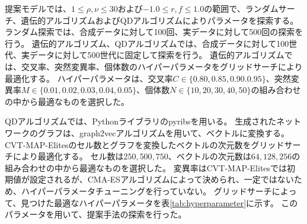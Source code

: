 \documentclass[uplatex,11pt,openany]{ujreport}
\begin{document}
        提案モデルでは、$1\leq \rho,\nu \leq30$および$-1.0\leq r,f\leq 1.0$の範囲で、ランダムサーチ、遺伝的アルゴリズムおよびQDアルゴリズムによりパラメータを探索する。
        ランダム探索では、合成データに対して100回、実データに対して500回の探索を行う。
        遺伝的アルゴリズム、QDアルゴリズムでは、合成データに対して100世代、実データに対して500世代に固定して探索を行う。
        遺伝的アルゴリズムでは、交叉率、突然変異率、個体数のハイパーパラメータをグリッドサーチにより最適化する。
        ハイパーパラメータは、交叉率$C\in\{0.80,0.85,0.90.0.95\}$、突然変異率$M\in\{0.01,0.02,0.03,0.04,0.05\}$、個体数$N\in\{10,20,30,40,50\}$の組み合わせの中から最適なものを選択した。

        QDアルゴリズムでは、Pythonライブラリのpyribs\cite{tjanakaPyribsBareBonesPython2023}を用いる。
        生成されたネットワークのグラフは、graph2vecアルゴリズムを用いて、ベクトルに変換する。
        CVT-MAP-Elitesのセル数とグラフを変換したベクトルの次元数をグリッドサーチにより最適化する。
        セル数は$250,500,750$、ベクトルの次元数は$64,128,256$の組み合わせの中から最適なものを選択した。
        変異率はCVT-MAP-Elitesでは初期値が設定されるが、CMA-ESアルゴリズム\cite{hansenReducingTimeComplexity2003}によって決められ、一定ではないため、ハイパーパラメータチューニングを行っていない。
        グリッドサーチによって、見つけた最適なハイパーパラメータを表\ref{tab:hyperparameter}に示す。
        このパラメータを用いて、提案手法の探索を行った。
\end{document}
